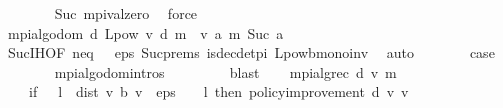 \begin{isabellebody}
\ \ \ \ \ \ \isamarkupfalse%
\ Suc\ mpi{\isacharunderscore}{\kern0pt}val{\isacharunderscore}{\kern0pt}zero\ \isamarkupfalse%
\ force\isanewline
\ \ \ \ \isamarkupfalse%
\ \isamarkupfalse%
\ {\isachardoublequoteopen}mpi{\isacharunderscore}{\kern0pt}algo{\isacharunderscore}{\kern0pt}dom\ {\isacharparenleft}{\kern0pt}{\isacharquery}{\kern0pt}d{\isacharcomma}{\kern0pt}\ L{\isacharunderscore}{\kern0pt}pow\ v\ {\isacharquery}{\kern0pt}d\ {\isacharparenleft}{\kern0pt}m\ {}\ v{\isacharparenright}{\kern0pt}{\isacharcomma}{\kern0pt}\ {\isasymlambda}a{\isachardot}{\kern0pt}\ m\ {\isacharparenleft}{\kern0pt}Suc\ a{\isacharparenright}{\kern0pt}{\isacharparenright}{\kern0pt}{\isachardoublequoteclose}\isanewline
\ \ \ \ \ \ \isamarkupfalse%
\ Suc{\isachardot}{\kern0pt}IH{\isacharbrackleft}{\kern0pt}OF\ n{\isacharunderscore}{\kern0pt}eq\ {\isacartoucheopen}{}\ {\isacharless}{\kern0pt}\ eps{\isacartoucheclose}{\isacharbrackright}{\kern0pt}\ Suc{\isachardot}{\kern0pt}prems\ is{\isacharunderscore}{\kern0pt}dec{\isacharunderscore}{\kern0pt}det{\isacharunderscore}{\kern0pt}pi\ L{\isacharunderscore}{\kern0pt}pow{\isacharunderscore}{\kern0pt}{\isasymL}\isactrlsub b{\isacharunderscore}{\kern0pt}mono{\isacharunderscore}{\kern0pt}inv\ \isamarkupfalse%
\ auto\isanewline
\ \ \ \ \isamarkupfalse%
\ \isamarkupfalse%
\ {\isacharquery}{\kern0pt}case\isanewline
\ \ \ \ \ \ \isamarkupfalse%
\ mpi{\isacharunderscore}{\kern0pt}algo{\isachardot}{\kern0pt}domintros\ \isanewline
\ \ \ \ \ \ \isamarkupfalse%
\ blast\isanewline
\ \ \isamarkupfalse%
\isanewline
{}\isamarkupfalse%
%
\endisatagproof
{\isafoldproof}%
%
\isadelimproof
\isanewline
%
\endisadelimproof
\isanewline
{}\isamarkupfalse%
\ {\isachardoublequoteopen}mpi{\isacharunderscore}{\kern0pt}alg{\isacharunderscore}{\kern0pt}rec\ d\ v\ m\ {\isasymequiv}\ \isanewline
\ \ \ \ {\isacharparenleft}{\kern0pt}if\ {}\ {\isacharasterisk}{\kern0pt}\ l\ {\isacharasterisk}{\kern0pt}\ dist\ v\ {\isacharparenleft}{\kern0pt}{\isasymL}\isactrlsub b\ v{\isacharparenright}{\kern0pt}\ {\isacharless}{\kern0pt}\ eps\ {\isacharasterisk}{\kern0pt}\ {\isacharparenleft}{\kern0pt}{}\ {\isacharminus}{\kern0pt}\ l{\isacharparenright}{\kern0pt}\ then\ {\isacharparenleft}{\kern0pt}policy{\isacharunderscore}{\kern0pt}improvement\ d\ v{\isacharcomma}{\kern0pt}\ v{\isacharparenright}{\kern0pt}\isanewline

\end{isabellebody}
